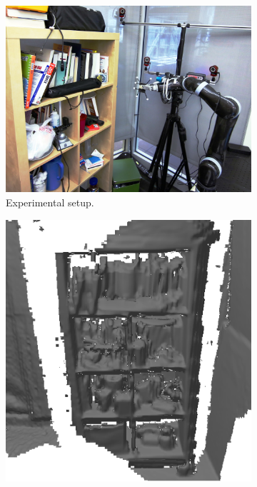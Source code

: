 \begin{figure}[width=0.5\columnwidth, ht]
	\centering
	\begin{subfigure}{0.5\columnwidth} 
	\centering
	\includegraphics[width=1.0\textwidth]{img/arm_slam/experimental_setup.JPG}
	\caption{Experimental setup.}
	\label{fig:real_robot}
	\end{subfigure}
	 \begin{subfigure}{0.29\columnwidth}
	 \centering 
	 \includegraphics[width=1.0\textwidth]{img/arm_slam/kinfu_bookshelf.png}

\end{subfigure}
\end{figure}
